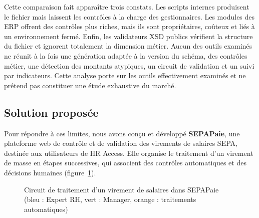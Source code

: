 Cette comparaison fait apparaître trois constats. Les scripts internes produisent le fichier mais laissent les contrôles à la charge des gestionnaires. Les modules des ERP offrent des contrôles plus riches, mais ils sont propriétaires, coûteux et liés à un environnement fermé. Enfin, les validateurs XSD publics vérifient la structure du fichier et ignorent totalement la dimension métier. Aucun des outils examinés ne réunit à la fois une génération adaptée à la version du schéma, des contrôles métier, une détection des montants atypiques, un circuit de validation et un suivi par indicateurs. Cette analyse porte sur les outils effectivement examinés et ne prétend pas constituer une étude exhaustive du marché.

\subsection{Solution proposée}

Pour répondre à ces limites, nous avons conçu et développé \textbf{SEPAPaie}, une plateforme web de contrôle et de validation des virements de salaires SEPA, destinée aux utilisateurs de HR Access. Elle organise le traitement d'un virement de masse en étapes successives, qui associent des contrôles automatiques et des décisions humaines (figure~\ref{fig:circuit}).

\begin{figure}[H]
\centering
{}
\caption{Circuit de traitement d'un virement de salaires dans SEPAPaie (bleu : Expert RH, vert : Manager, orange : traitements automatiques)}
\label{fig:circuit}
\end{figure}

